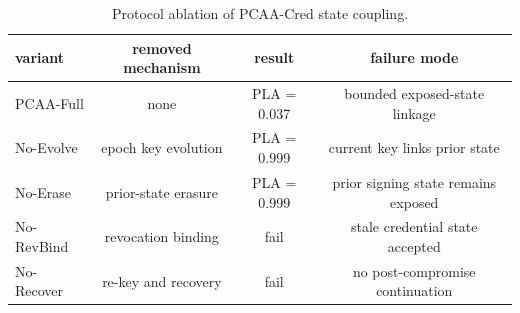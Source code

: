 \begin{table}[htbp]
\centering
\caption{Protocol ablation of PCAA-Cred state coupling.}
\label{tab:ablation}
\begin{tabular}{@{}lccc@{}}
\toprule
variant & removed mechanism & result & failure mode \\
\midrule
PCAA-Full & none & PLA = 0.037 & bounded exposed-state linkage \\
No-Evolve & epoch key evolution & PLA = 0.999 & current key links prior state \\
No-Erase & prior-state erasure & PLA = 0.999 & prior signing state remains exposed \\
No-RevBind & revocation binding & fail & stale credential state accepted \\
No-Recover & re-key and recovery & fail & no post-compromise continuation \\
\bottomrule
\end{tabular}
\end{table}
